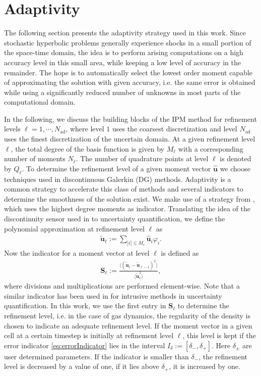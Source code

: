\section{Adaptivity}
\label{sec:adaptivity}

The following section presents the adaptivity strategy used in this work. Since stochastic hyperbolic problems generally experience shocks in a small portion of the space-time domain, the idea is to perform arising computations on a high accuracy level in this small area, while keeping a low level of accuracy in the remainder. The hope is to automatically select the lowest order moment capable of approximating the solution with given accuracy, i.e. the same error is obtained while using a significantly reduced number of unknowns in most parts of the computational domain.

In the following, we discuss the building blocks of the IPM method for refinement levels $\ell = 1,\cdots,N_{\text{ad}}$, where level $1$ uses the coarsest discretization and level $N_{\text{ad}}$ uses the finest discretization of the uncertain domain. At a given refinement level $\ell$, the total degree of the basis function is given by $M_{\ell}$ with a corresponding number of moments $N_{\ell}$. The number of quadrature points at level $\ell$ is denoted by $Q_{\ell}$. To determine the refinement level of a given moment vector $\bm{\hat u}$ we choose techniques used in discontinuous Galerkin (DG) methods. Adaptivity is a common strategy to accelerate this class of methods and several indicators to determine the smoothness of the solution exist. We make use of a strategy from \cite{persson2006sub}, which uses the highest degree moments as indicator. Translating the idea of the discontinuity sensor used in \cite{persson2006sub} to uncertainty quantification, we define the polynomial approximation at refinement level $\ell$ as
\begin{align*}
\bm{\tilde u}_{\ell} := \sum_{|i|\leq M_{\ell}} \bm{\hat{u}}_i \varphi_i.
\end{align*}
Now the indicator for a moment vector at level $\ell$ is defined as
\begin{align}\label{eq:errorIndicator}
\bm S_{\ell} := \frac{\langle \left(\bm{\tilde u}_{\ell} - \bm{\tilde u}_{\ell-1}\right)^2\rangle}{\langle \bm{\tilde u}_{\ell}^2\rangle},
\end{align}
where divisions and multiplications are performed element-wise. Note that a similar indicator has been used in \cite{kroker2012finite} for intrusive methods in uncertainty quantification. In this work, we use the first entry in $\bm S_{\ell}$ to determine the refinement level, i.e. in the case of gas dynamics, the regularity of the density is chosen to indicate an adequate refinement level. If the moment vector in a given cell at a certain timestep is initially at refinement level $\ell$, this level is kept if the error indicator \eqref{eq:errorIndicator} lies in the interval $I_{\delta}:=[\delta_{-},\delta_{+}]$. Here $\delta_{\pm}$ are user determined parameters. If the indicator is smaller than $\delta_-$, the refinement level is decreased by a value of one, if it lies above $\delta_+$, it is increased by one.

